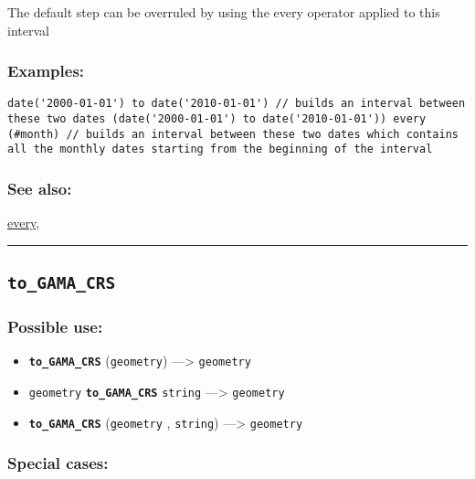 \documentclass[]{book}
\providecommand{\tightlist}{%
  \setlength{\itemsep}{0pt}\setlength{\parskip}{0pt}}
\theoremstyle{definition}
\theoremstyle{definition}
\theoremstyle{definition}
\theoremstyle{remark}
\begin{document}
The default step can be overruled by using the every operator applied to
this interval

\subsubsection{Examples:}\label{examples-358}

\begin{verbatim}
date('2000-01-01') to date('2010-01-01') // builds an interval between these two dates (date('2000-01-01') to date('2010-01-01')) every (#month) // builds an interval between these two dates which contains all the monthly dates starting from the beginning of the interval 
\end{verbatim}

\subsubsection{See also:}\label{see-also-205}

\href{OperatorsDH\#every}{every},

\begin{center}\rule{0.5\linewidth}{\linethickness}\end{center}

\subsection{\texorpdfstring{\texttt{to\_GAMA\_CRS}}{to\_GAMA\_CRS}}\label{to_gama_crs}

\subsubsection{Possible use:}\label{possible-use-520}

\begin{itemize}
\tightlist
\item
  \textbf{\texttt{to\_GAMA\_CRS}} (\texttt{geometry}) ---\textgreater{}
  \texttt{geometry}
\item
  \texttt{geometry} \textbf{\texttt{to\_GAMA\_CRS}} \texttt{string}
  ---\textgreater{} \texttt{geometry}
\item
  \textbf{\texttt{to\_GAMA\_CRS}} (\texttt{geometry} , \texttt{string})
  ---\textgreater{} \texttt{geometry}
\end{itemize}

\subsubsection{Special cases:}\label{special-cases-137}
\end{document}
